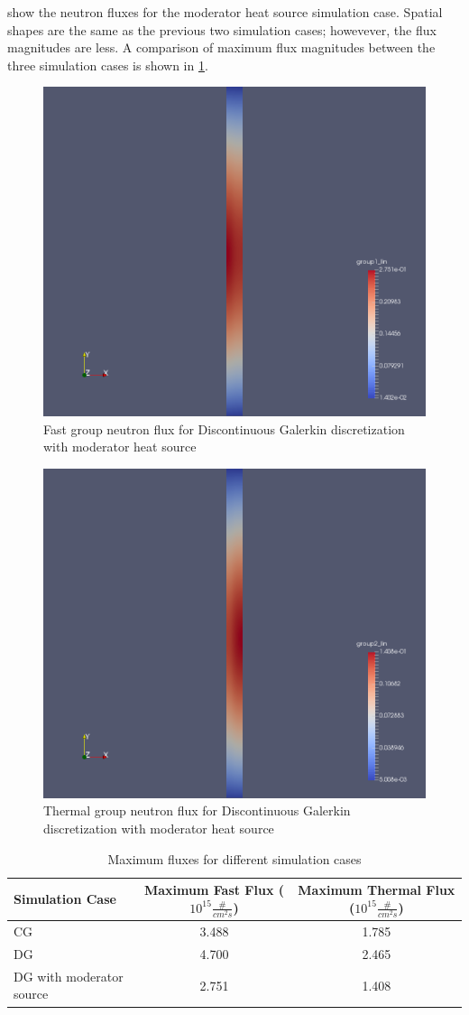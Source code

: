 \documentclass{article}
\begin{document}
 show the neutron fluxes
for the moderator heat source simulation case. Spatial shapes are the same as
the previous two simulation cases; howevever, the flux magnitudes are
less. A comparison of maximum flux magnitudes between the three simulation cases
is shown in \cref{tab:max_fluxes}.

\begin{figure}[htpb]
  \centering
  \includegraphics[width=.5\textwidth]{dg_mod_source_group1.png}
  \caption{Fast group neutron flux for Discontinuous Galerkin discretization
    with moderator heat source}
  \label{fig:dg_mod_source_group1}
\end{figure}

\begin{figure}[htpb]
  \centering
  \includegraphics[width=.5\textwidth]{dg_mod_source_group2.png}
  \caption{Thermal group neutron flux for Discontinuous Galerkin discretization
    with moderator heat source}
  \label{fig:dg_mod_source_group2}
\end{figure}

\begin{table}[htpb]
    \begin{center}
      \begin{tabular}{l|c|c}
        Simulation Case & Maximum Fast Flux ($10^{15}\frac{\#}{cm^2s}$) & Maximum Thermal
        Flux ($10^{15}\frac{\#}{cm^2s}$)\\
        \hline \hline
        \gls{CG} & 3.488 & 1.785 \\
        \gls{DG} & 4.700 & 2.465 \\
        \gls{DG} with moderator source & 2.751 & 1.408 \\
      \end{tabular}
    \end{center}
    \caption{Maximum fluxes for different simulation cases}
    \label{tab:max_fluxes}
\end{table}

\FloatBarrier
\clearpage
\printglossary[type=\acronymtype]


\end{document}
